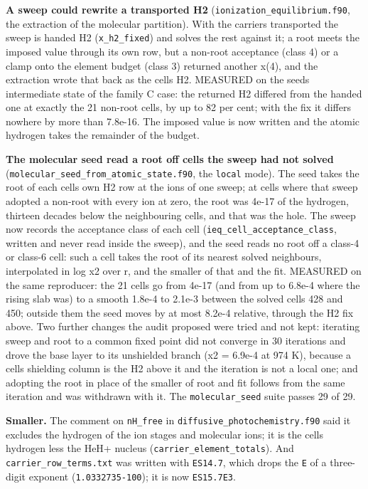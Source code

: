 \documentclass[english,a4paper]{my_memo}
\begin{document}
\textbf{A sweep could rewrite a transported H2} (\texttt{ionization\_equilibrium.f90}, the
extraction of the molecular partition). With the carriers transported the
sweep is handed H2 (\texttt{x\_h2\_fixed}) and solves the rest against it; a root
meets the imposed value through its own row, but a non-root acceptance
(class 4) or a clamp onto the element budget (class 3) returned another
x(4), and the extraction wrote that back as the cell\textquotesingle s H2. MEASURED on the
seed\textquotesingle s intermediate state of the family C case: the returned H2 differed from
the handed one at exactly the 21 non-root cells, by up to 82 per cent; with
the fix it differs nowhere by more than 7.8e-16. The imposed value is now
written and the atomic hydrogen takes the remainder of the budget.

\textbf{The molecular seed read a root off cells the sweep had not solved}
(\texttt{molecular\_seed\_from\_atomic\_state.f90}, the \texttt{local} mode). The seed takes the
root of each cell\textquotesingle s own H2 row at the ions of one sweep; at cells where that
sweep adopted a non-root with every ion at zero, the root was 4e-17 of the
hydrogen, thirteen decades below the neighbouring cells, and that was the
hole. The sweep now records the acceptance class of each cell
(\texttt{ieq\_cell\_acceptance\_class}, written and never read inside the sweep), and
the seed reads no root off a class-4 or class-6 cell: such a cell takes the
root of its nearest solved neighbours, interpolated in log x2 over r, and the
smaller of that and the fit. MEASURED on the same reproducer: the 21 cells go
from 4e-17 (and from up to 6.8e-4 where the rising slab was) to a smooth
1.8e-4 to 2.1e-3 between the solved cells 428 and 450; outside them the seed
moves by at most 8.2e-4 relative, through the H2 fix above. Two further
changes the audit proposed were tried and not kept: iterating sweep and root
to a common fixed point did not converge in 30 iterations and drove the base
layer to its unshielded branch (x2 = 6.9e-4 at 974 K), because a cell\textquotesingle s
shielding column is the H2 above it and the iteration is not a local one; and
adopting the root in place of the smaller of root and fit follows from the
same iteration and was withdrawn with it. The \texttt{molecular\_seed} suite passes
29 of 29.

\textbf{Smaller.} The comment on \texttt{nH\_free} in \texttt{diffusive\_photochemistry.f90} said
it excludes the hydrogen of the ion stages and molecular ions; it is the
cell\textquotesingle s hydrogen less the HeH+ nucleus (\texttt{carrier\_element\_totals}). And
\texttt{carrier\_row\_terms.txt} was written with \texttt{ES14.7}, which drops the \texttt{E} of a
three-digit exponent (\texttt{1.0332735-100}); it is now \texttt{ES15.7E3}.
\end{document}
